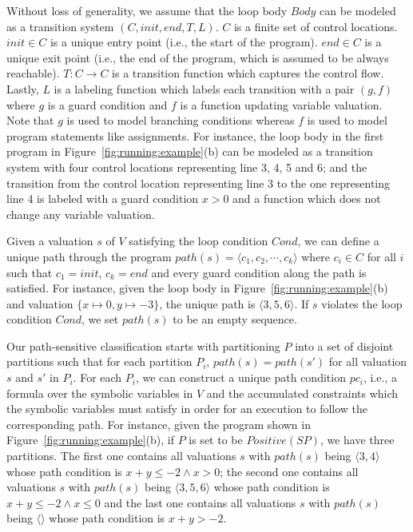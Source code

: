 Without loss of generality, we assume that the loop body $Body$ can be modeled as a transition system $(C, init, end, T, L)$. $C$ is a finite set of control locations. $init \in C$ is a unique entry point (i.e., the start of the program). $end \in C$ is a unique exit point (i.e., the end of the program, which is assumed to be always reachable). $T: C \rightarrow C$ is a transition function which captures the control flow. Lastly, $L$ is a labeling function which labels each transition with a pair $(g, f)$ where $g$ is a guard condition and $f$ is a function updating variable valuation. Note that $g$ is used to model branching conditions whereas $f$ is used to model program statements like assignments. For instance, the loop body in the first program in Figure~\ref{fig:running:example}(b) can be modeled as a transition system with four control locations representing line 3, 4, 5 and 6; and the transition from the control location representing line 3 to the one representing line 4 is labeled with a guard condition $x>0$ and a function which does not change any variable valuation.

Given a valuation $s$ of $V$ satisfying the loop condition $Cond$, we can define a unique path through the program $path(s) = \langle c_1, c_2, \cdots, c_k \rangle$ where $c_i \in C$ for all $i$ such that $c_1 = init$, $c_k = end$ and every guard condition along the path is satisfied. %
For instance, given the loop body in Figure~\ref{fig:running:example}(b) and valuation $\{x \mapsto 0, y \mapsto -3\}$, the unique path is $\langle 3,5,6 \rangle$. If $s$ violates the loop condition $Cond$, we set $path(s)$ to be an empty sequence.

Our path-sensitive classification starts with partitioning $P$ into a set of disjoint partitions such that for each partition $P_i$, $path(s) = path(s')$ for all valuation $s$ and $s'$ in $P_i$. For each $P_i$, we can construct a unique path condition $pc_i$, i.e., a formula over the symbolic variables in $V$ and the accumulated
constraints which the symbolic variables must satisfy in order for an execution to follow the corresponding path. For instance, given the program shown in Figure~\ref{fig:running:example}(b), if $P$ is set to be $Positive(SP)$, we have three partitions. The first one contains all valuations $s$ with $path(s)$ being $\langle 3,4\rangle$ whose path condition is $x+y\leq -2 \land x > 0$; the second one contains all valuations $s$ with $path(s)$ being $\langle 3,5,6\rangle$ whose path condition is $x+y\leq -2 \land x \leq 0$ and the last one contains all valuations $s$ with $path(s)$ being $\langle \rangle$ whose path condition is $x+y > -2$.


